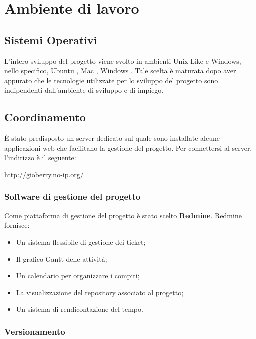 
\section{Ambiente di lavoro} 

\subsection{Sistemi Operativi}

L’intero sviluppo del progetto viene svolto in ambienti Unix-Like e Windows, nello specifico, Ubuntu , Mac , Windows . Tale scelta è maturata dopo aver appurato che le tecnologie utilizzate per lo sviluppo del progetto sono indipendenti dall’ambiente di sviluppo e di impiego.

\subsection{Coordinamento}

È stato predisposto un server dedicato sul quale sono installate alcune applicazioni web
che facilitano la gestione del progetto. Per connettersi al server, l'indirizzo è il seguente:\\
\begin{center}
\url{http://gioberry.no-ip.org/}
\end{center}
\subsubsection{Software di gestione del progetto} 
\label{subsec:Software di gestione del prodotto}
Come piattaforma di gestione del progetto è stato scelto \textbf{Redmine}. Redmine fornisce:
\begin{itemize}
\item Un sistema flessibile di gestione dei ticket;
\item Il grafico Gantt delle attività;
\item Un calendario per organizzare i compiti;
\item La visualizzazione del repository associato al progetto;
\item Un sistema di rendicontazione del tempo.
\end{itemize}


\subsubsection{Versionamento}


